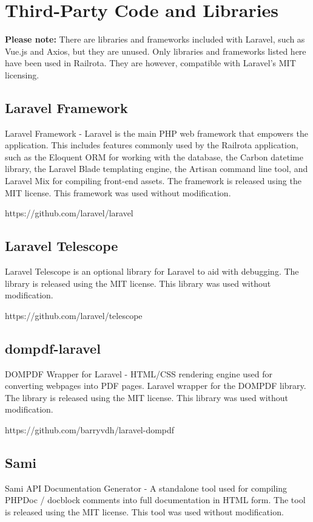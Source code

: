 \chapter{Third-Party Code and Libraries}

\textbf{Please note: } There are libraries and frameworks included with Laravel, such as Vue.js and Axios, but they are unused. Only libraries and frameworks listed here have been used in Railrota. They are however, compatible with Laravel's MIT licensing.

\section{Laravel Framework}
Laravel Framework - Laravel is the main PHP web framework that empowers the application. This includes features commonly used by the Railrota application, such as the Eloquent ORM for working with the database, the Carbon datetime library, the Laravel Blade templating engine, the Artisan command line tool, and Laravel Mix for compiling front-end assets. The framework is released using the MIT license. This framework was used without modification. 

https://github.com/laravel/laravel

\section{Laravel Telescope}
Laravel Telescope is an optional library for Laravel to aid with debugging. The library is released using the MIT license. This library was used without modification.

https://github.com/laravel/telescope

\section{dompdf-laravel}
DOMPDF Wrapper for Laravel - HTML/CSS rendering engine used for converting webpages into PDF pages. Laravel wrapper for the DOMPDF library. The library is released using the MIT license. This library was used without modification.

https://github.com/barryvdh/laravel-dompdf

\section{Sami}
Sami API Documentation Generator - A standalone tool used for compiling PHPDoc / docblock comments into full documentation in HTML form. The tool is released using the MIT license. This tool was used without modification.

